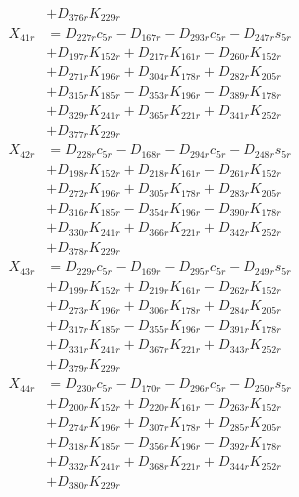 \begin{multicols}{2}
\begin{align}
&+ D_{376r}K_{229r} \nonumber \\
X_{41r} &= D_{227r}c_{5r} - D_{167r} - D_{293r}c_{5r} - D_{247r}s_{5r}  \nonumber \\
&+ D_{197r}K_{152r} + D_{217r}K_{161r} - D_{260r}K_{152r}  \nonumber \\
&+ D_{271r}K_{196r} + D_{304r}K_{178r} + D_{282r}K_{205r}  \nonumber \\
&+ D_{315r}K_{185r} - D_{353r}K_{196r} - D_{389r}K_{178r}  \nonumber \\
&+ D_{329r}K_{241r} + D_{365r}K_{221r} + D_{341r}K_{252r}  \nonumber \\
&+ D_{377r}K_{229r} \nonumber \\
X_{42r} &= D_{228r}c_{5r} - D_{168r} - D_{294r}c_{5r} - D_{248r}s_{5r}  \nonumber \\
&+ D_{198r}K_{152r} + D_{218r}K_{161r} - D_{261r}K_{152r}  \nonumber \\
&+ D_{272r}K_{196r} + D_{305r}K_{178r} + D_{283r}K_{205r}  \nonumber \\
&+ D_{316r}K_{185r} - D_{354r}K_{196r} - D_{390r}K_{178r}  \nonumber \\
&+ D_{330r}K_{241r} + D_{366r}K_{221r} + D_{342r}K_{252r}  \nonumber \\
&+ D_{378r}K_{229r} \nonumber \\
X_{43r} &= D_{229r}c_{5r} - D_{169r} - D_{295r}c_{5r} - D_{249r}s_{5r}  \nonumber \\
&+ D_{199r}K_{152r} + D_{219r}K_{161r} - D_{262r}K_{152r}  \nonumber \\
&+ D_{273r}K_{196r} + D_{306r}K_{178r} + D_{284r}K_{205r}  \nonumber \\
&+ D_{317r}K_{185r} - D_{355r}K_{196r} - D_{391r}K_{178r}  \nonumber \\
&+ D_{331r}K_{241r} + D_{367r}K_{221r} + D_{343r}K_{252r}  \nonumber \\
&+ D_{379r}K_{229r} \nonumber \\
X_{44r} &= D_{230r}c_{5r} - D_{170r} - D_{296r}c_{5r} - D_{250r}s_{5r}  \nonumber \\
&+ D_{200r}K_{152r} + D_{220r}K_{161r} - D_{263r}K_{152r}  \nonumber \\
&+ D_{274r}K_{196r} + D_{307r}K_{178r} + D_{285r}K_{205r}  \nonumber \\
&+ D_{318r}K_{185r} - D_{356r}K_{196r} - D_{392r}K_{178r}  \nonumber \\
&+ D_{332r}K_{241r} + D_{368r}K_{221r} + D_{344r}K_{252r}  \nonumber \\
&+ D_{380r}K_{229r} \nonumber \\

\end{align}
\end{multicols}
